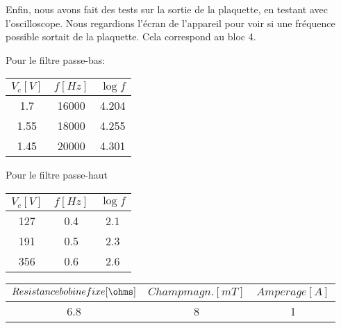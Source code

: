Enfin, nous avons fait des tests sur la sortie de la plaquette, en testant avec l'oscilloscope.  Nous regardions l'écran de
l'appareil pour voir si une fréquence possible sortait de la plaquette.  Cela correspond au bloc 4.


Pour le filtre passe-bas:
\begin{center}
\begin{tabular}{|c|c|c|}
\hline
$V_c[V]$ & $f[Hz]$ & $\log{f}$ \\
\hline
1.7 & 16000 & 4.204 \\
\hline
1.55 & 18000 & 4.255 \\
\hline
1.45 & 20000 & 4.301 \\
\hline
\end{tabular}
\end{center}

Pour le filtre passe-haut

\begin{center}
	\begin{tabular}{|c|c|c|}
		\hline
		$V_c[V]$ & $f[Hz]$ & $\log{f}$ \\
		\hline
		127 & 0.4 & 2.1\\
		\hline
		191 & 0.5 & 2.3\\
		\hline
		356 & 0.6 & 2.6 \\
		\hline
	\end{tabular}
\end{center}

\begin{center}
	\begin{tabular}{|c|c|c|}
		\hline
		$Resistance bobine fixe[\ohms]$ & $Champ magn.[mT]$ & $Amperage[A]$ \\
		\hline
		6.8 & 8 & 1\\
		\hline
	\end{tabular}
\end{center}


